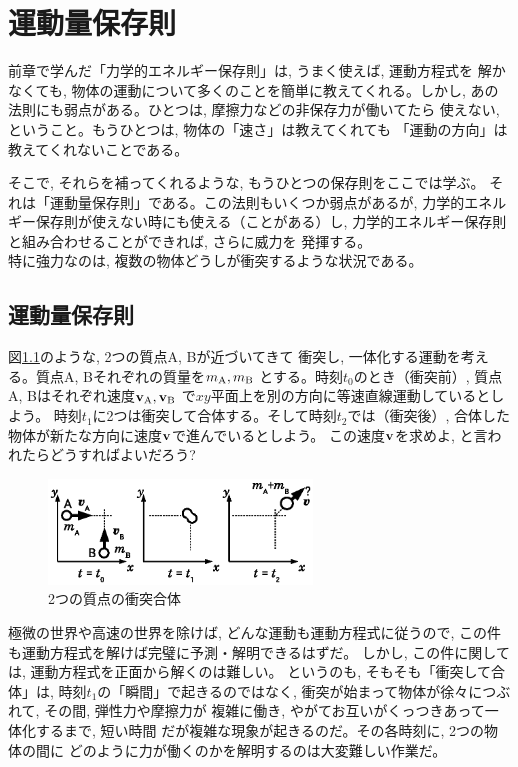 \chapter{運動量保存則}

前章で学んだ「力学的エネルギー保存則」は, うまく使えば, 運動方程式を
解かなくても, 物体の運動について多くのことを簡単に教えてくれる。しかし, 
あの法則にも弱点がある。ひとつは, 摩擦力などの非保存力が働いてたら
使えない, ということ。もうひとつは, 物体の「速さ」は教えてくれても
「運動の方向」は教えてくれないことである。

そこで, それらを補ってくれるような, もうひとつの保存則をここでは学ぶ。
それは「運動量保存則」である。この法則もいくつか弱点があるが, 
力学的エネルギー保存則が使えない時にも使える（ことがある）し, 
力学的エネルギー保存則と組み合わせることができれば, さらに威力を
発揮する。\\

特に強力なのは, 複数の物体どうしが衝突するような状況である。\\

\section{運動量保存則}

図\ref{fig:collision}のような, 2つの質点A, Bが近づいてきて
衝突し, 一体化する運動を考える。質点A, Bそれぞれの質量を$m_{\text A}, m_{\text B}$
とする。時刻$t_0$のとき（衝突前）, 質点A, Bはそれぞれ速度${\bf v}_{\text A}, {\bf v}_{\text B}$
で$xy$平面上を別の方向に等速直線運動しているとしよう。
時刻$t_1$に2つは衝突して合体する。そして時刻$t_2$では（衝突後）, 
合体した物体が新たな方向に速度${\bf v}$で進んでいるとしよう。
この速度${\bf v}$を求めよ, と言われたらどうすればよいだろう?

\begin{figure}[h]
    \centering
    \includegraphics[width=7.0cm]{collision.eps}
    \caption{2つの質点の衝突合体}\label{fig:collision}
\end{figure}

極微の世界や高速の世界を除けば, どんな運動も運動方程式に従うので, 
この件も運動方程式を解けば完璧に予測・解明できるはずだ。
しかし, この件に関しては, 運動方程式を正面から解くのは難しい。
というのも, そもそも「衝突して合体」は, 時刻$t_1$の「瞬間」で起きるのではなく, 
衝突が始まって物体が徐々につぶれて, その間, 弾性力や摩擦力が
複雑に働き, やがてお互いがくっつきあって一体化するまで, 短い時間
だが複雑な現象が起きるのだ。その各時刻に, 2つの物体の間に
どのように力が働くのかを解明するのは大変難しい作業だ。

